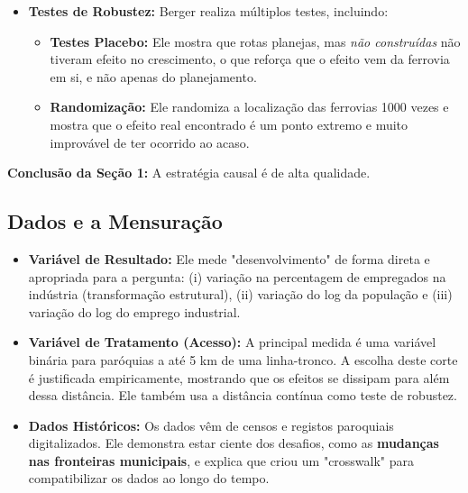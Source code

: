 \documentclass[12pt, a4paper]{article}
\begin{document}
\begin{itemize}
    \item \textbf{Testes de Robustez:} Berger realiza múltiplos testes, incluindo:
    \begin{itemize}
        \item \textbf{Testes Placebo:} Ele mostra que rotas planejas, mas \textit{não construídas} não tiveram efeito no crescimento, o que reforça que o efeito vem da ferrovia em si, e não apenas do planejamento.
        \item \textbf{Randomização:} Ele randomiza a localização das ferrovias 1000 vezes e mostra que o efeito real encontrado é um ponto extremo e muito improvável de ter ocorrido ao acaso.
    \end{itemize}
\end{itemize}

\noindent\textbf{Conclusão da Seção 1:} A estratégia causal é de alta qualidade.

\subsection{Dados e a Mensuração}
\begin{itemize}
    \item \textbf{Variável de Resultado:} Ele mede "desenvolvimento" de forma direta e apropriada para a pergunta: (i) variação na percentagem de empregados na indústria (transformação estrutural), (ii) variação do log da população e (iii) variação do log do emprego industrial.
    \item \textbf{Variável de Tratamento (Acesso):} A principal medida é uma variável binária para paróquias a até 5 km de uma linha-tronco. A escolha deste corte é justificada empiricamente, mostrando que os efeitos se dissipam para além dessa distância. Ele também usa a distância contínua como teste de robustez.
    \item \textbf{Dados Históricos:} Os dados vêm de censos e registos paroquiais digitalizados. Ele demonstra estar ciente dos desafios, como as \textbf{mudanças nas fronteiras municipais}, e explica que criou um "crosswalk" para compatibilizar os dados ao longo do tempo.
\end{itemize}
\end{document}
